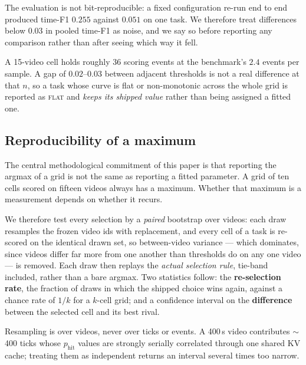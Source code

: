 The evaluation is not bit-reproducible: a fixed configuration re-run end to end
produced time-F1 $0.255$ against $0.051$ on one task. We therefore treat
differences below $0.03$ in pooled time-F1 as noise, and we say so before
reporting any comparison rather than after seeing which way it fell.

A 15-video cell holds roughly 36 scoring events at the benchmark's $2.4$ events
per sample. A gap of $0.02$--$0.03$ between adjacent thresholds is not a real
difference at that $n$, so a task whose curve is flat or non-monotonic across the
whole grid is reported as \textsc{flat} and \emph{keeps its shipped value} rather
than being assigned a fitted one.

\subsection{Reproducibility of a maximum}

The central methodological commitment of this paper is that reporting the argmax
of a grid is not the same as reporting a fitted parameter. A grid of ten cells
scored on fifteen videos always has a maximum. Whether that maximum is a
measurement depends on whether it recurs.

We therefore test every selection by a \emph{paired} bootstrap over videos: each
draw resamples the frozen video ids with replacement, and every cell of a task is
re-scored on the identical drawn set, so between-video variance --- which
dominates, since videos differ far more from one another than thresholds do on any
one video --- is removed. Each draw then replays the \emph{actual selection rule},
tie-band included, rather than a bare argmax. Two statistics follow: the
\textbf{re-selection rate}, the fraction of draws in which the shipped choice wins
again, against a chance rate of $1/k$ for a $k$-cell grid; and a confidence
interval on the \textbf{difference} between the selected cell and its best rival.

Resampling is over videos, never over ticks or events. A 400\,s video contributes
$\sim$400 ticks whose $p_{\mathrm{hit}}$ values are strongly serially correlated
through one shared KV cache; treating them as independent returns an interval
several times too narrow.
